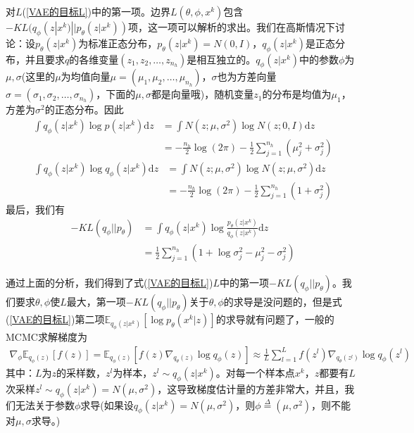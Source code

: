            \par
            对$L$(\ref{VAE的目标L})中的第一项。边界$L(\theta,\phi,x^k)$包含$-KL(q_\phi(z|x^k)||p_\theta(z|x^k))$项，这一项可以解析的求出。我们在高斯情况下讨论：设$p_\theta(z|x^k)$为标准正态分布，$p_\theta(z|x^k) = N(0,I)$，$q_\phi(z|x^k)$是正态分布，并且要求$q$的各维变量$(z_1,z_2,\dots,z_{n_h})$是相互独立的。$q_\phi(z|x^k)$中的参数$\phi$为$\mu,\sigma$(这里的$\mu$为均值向量$\mu=(\mu_1,\mu_2,\dots,\mu_{n_h})$，$\sigma$也为方差向量$\sigma=(\sigma_1,\sigma_2,\dots,\sigma_{n_h})$，下面的$\mu,\sigma$都是向量哦)，随机变量$z_1$的分布是均值为$\mu_1$，方差为$\sigma^2$的正态分布。因此
            \begin{align*}
            \int q_\phi(z|x^k) \log p(z|x^k)\mathrm{d}z &= \int N(z;\mu,\sigma^2)\log N(z;0,I)\mathrm{d}z\\
            &= -\frac{n_h}{2} \log(2\pi) - \frac{1}{2} \sum_{j=1}^{n_h}(\mu_j^2+\sigma_j^2)
            \end{align*}
            \begin{align*}
            \int q_\phi(z|x^k) \log q_\phi(z|x^k)\mathrm{d}z &= \int N(z;\mu,\sigma^2)\log N(z;\mu,\sigma^2)\mathrm{d}z\\
            &= -\frac{n_h}{2} \log(2\pi) - \frac{1}{2} \sum_{j=1}^{n_h}(1+\sigma_j^2)
            \end{align*}
            最后，我们有
            \begin{align*}
            -KL(q_\phi||p_\theta) &= \int q_\phi(z|x^k)\log \frac{p_\theta(z|x^k)}{q_\phi(z|x^k)}\mathrm{d}z\\
            &= \frac{1}{2} \sum_{j=1}^{n_h} \left( 1+\log \sigma_j^2 -\mu_j^2- \sigma_j^2 \right)
            \end{align*}
            \par
            通过上面的分析，我们得到了式(\ref{VAE的目标L})$L$中的第一项$-KL(q_\phi||p_\theta)$。我们要求$\theta,\phi$使$L$最大，第一项$-KL(q_\phi||p_\theta)$关于$\theta,\phi$的求导是没问题的，但是式(\ref{VAE的目标L})第二项$\mathbb{E} _{q_\phi(z|x^k)} \left[ \log p_\theta(x^k|z) \right]$的求导就有问题了，一般的MCMC求解梯度为
            \begin{align*}
            \nabla_\phi \mathbb{E} _{q_\phi(z)} [f(z)] = \mathbb{E}_{q_\phi(z)} \left[ f(z)\nabla_{q_\theta(z)} \log q_\phi(z)  \right] \approx \frac{1}{L} \sum_{l=1}^L f(z^l)\nabla_{q_\theta(z^l)} \log q_\phi(z^l)
            \end{align*}
            其中：$L$为$z$的采样数，$z^l$为样本，$z^l\sim q_\phi(z|x^k)$。对每一个样本点$x^k$，$z$都要有$L$次采样$z^l \sim q_\phi(z|x^k) = N(\mu,\sigma^2)$，这导致梯度估计量的方差非常大，并且，我们无法关于参数$\phi$求导(如果设$q_\phi(z|x^k) = N(\mu,\sigma^2)$，则$\phi \overset{\Delta}{=}(\mu,\sigma^2)$，则不能对$\mu,\sigma$求导。)
